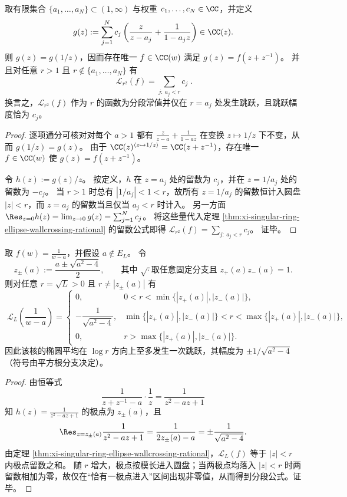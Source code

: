 \begin{proposition}\label{prop:xi-ellipse-wallcrossing-realize-finite-jump-data}
取有限集合 \(\{a_1,\dots,a_N\}\subset(1,\infty)\) 与权重 \(c_1,\dots,c_N\in\CC\)，并定义
\[
g(z):=\sum_{j=1}^N c_j\left(\frac{z}{z-a_j}+\frac{1}{1-a_j z}\right)\in\CC(z).
\]
则 \(g(z)=g(1/z)\)，因而存在唯一 \(f\in\CC(w)\) 满足 \(g(z)=f(z+z^{-1})\)。
并且对任意 \(r>1\) 且 \(r\notin\{a_1,\dots,a_N\}\) 有
\[
\boxed{\;
\mathcal{L}_{r^2}(f)=\sum_{j:\ a_j<r} c_j\; }.
\]
换言之，\(\mathcal{L}_{r^2}(f)\) 作为 \(r\) 的函数为分段常值并仅在 \(r=a_j\) 处发生跳跃，且跳跃幅度恰为 \(c_j\)。
\end{proposition}
\begin{proof}
逐项通分可核对对每个 \(a>1\) 都有
\(
\frac{z}{z-a}+\frac{1}{1-a z}
\)
在变换 \(z\mapsto 1/z\) 下不变，从而 \(g(1/z)=g(z)\)。
由于 \(\CC(z)^{\langle z\mapsto 1/z\rangle}=\CC(z+z^{-1})\)，存在唯一 \(f\in\CC(w)\) 使 \(g(z)=f(z+z^{-1})\)。
\par
令 \(h(z):=g(z)/z\)。
按定义，\(h\) 在 \(z=a_j\) 处的留数为 \(c_j\)，并在 \(z=1/a_j\) 处的留数为 \(-c_j\)。
当 \(r>1\) 时总有 \(|1/a_j|<1<r\)，故所有 \(z=1/a_j\) 的留数恒计入圆盘 \(|z|<r\)，而 \(z=a_j\) 的留数当且仅当 \(a_j<r\) 时计入。
另一方面 \(\Res_{z=0}h(z)=\lim_{z\to 0}g(z)=\sum_{j=1}^N c_j\)。
将这些量代入定理 \ref{thm:xi-singular-ring-ellipse-wallcrossing-rational} 的留数公式即得
\(
\mathcal{L}_{r^2}(f)=\sum_{j:\ a_j<r}c_j
\)。
证毕。
\end{proof}


\begin{corollary}\label{cor:xi-singular-ring-ellipse-simple-pole-response}
取 \(f(w)=\frac{1}{w-a}\)，并假设 \(a\notin E_L\)。
令
\[
z_\pm(a):=\frac{a\pm\sqrt{a^2-4}}{2},
\qquad
\text{其中 }\sqrt{\cdot}\text{取任意固定分支且 }z_+(a)z_-(a)=1.
\]
则对任意 \(r=\sqrt{L}>0\) 且 \(r\neq |z_\pm(a)|\) 有
\[
\boxed{\;
\mathcal{L}_L\!\left(\frac{1}{w-a}\right)=
\begin{cases}
0, & 0<r<\min\{|z_+(a)|,|z_-(a)|\},\\[4pt]
-\dfrac{1}{\sqrt{a^2-4}}, & \min\{|z_+(a)|,|z_-(a)|\}<r<\max\{|z_+(a)|,|z_-(a)|\},\\[8pt]
0, & r>\max\{|z_+(a)|,|z_-(a)|\}.
\end{cases}}
\]
因此该核的椭圆平均在 \(\log r\) 方向上至多发生一次跳跃，其幅度为 \(\pm 1/\sqrt{a^2-4}\)（符号由平方根分支决定）。
\end{corollary}
\begin{proof}
由恒等式
\[
\frac{1}{z+z^{-1}-a}\cdot\frac{1}{z}=\frac{1}{z^2-a z+1}
\]
知 \(h(z)=\frac{1}{z^2-a z+1}\) 的极点为 \(z_\pm(a)\)，且
\[
\Res_{z=z_\pm(a)}\frac{1}{z^2-a z+1}
=\frac{1}{2z_\pm(a)-a}
=\pm\frac{1}{\sqrt{a^2-4}}.
\]
由定理 \ref{thm:xi-singular-ring-ellipse-wallcrossing-rational}，\(\mathcal{L}_L(f)\) 等于 \(|z|<r\) 内极点留数之和。
随 \(r\) 增大，极点按模长进入圆盘；当两极点均落入 \(|z|<r\) 时两留数相加为零，故仅在“恰有一极点进入”区间出现非零值，从而得到分段公式。证毕。
\end{proof}

